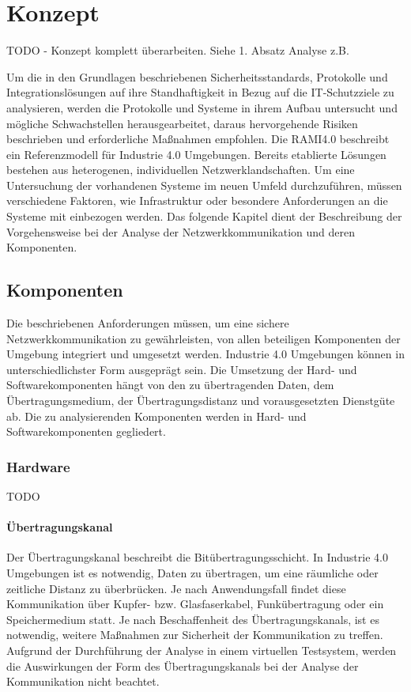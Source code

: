 \chapter{Konzept}
TODO - Konzept komplett überarbeiten. Siehe 1. Absatz Analyse z.B.

Um die in den Grundlagen beschriebenen Sicherheitsstandards, Protokolle und Integrationslösungen auf ihre Standhaftigkeit in Bezug auf die IT-Schutzziele zu analysieren, werden die Protokolle und Systeme in ihrem Aufbau untersucht und mögliche Schwachstellen herausgearbeitet, daraus hervorgehende Risiken beschrieben und erforderliche Maßnahmen empfohlen. Die \ac{RAMI4.0} beschreibt ein Referenzmodell für Industrie 4.0 Umgebungen. Bereits etablierte Lösungen bestehen aus heterogenen, individuellen Netzwerklandschaften. Um eine Untersuchung der vorhandenen Systeme im neuen Umfeld durchzuführen, müssen verschiedene Faktoren, wie Infrastruktur oder besondere Anforderungen an die Systeme mit einbezogen werden. Das folgende Kapitel dient der Beschreibung der Vorgehensweise bei der Analyse der Netzwerkkommunikation und deren Komponenten.

\section{Komponenten}
Die beschriebenen Anforderungen müssen, um eine sichere Netzwerkkommunikation zu gewährleisten, von allen beteiligen Komponenten der Umgebung integriert und umgesetzt werden. Industrie 4.0 Umgebungen können in unterschiedlichster Form ausgeprägt sein. Die Umsetzung der Hard- und Softwarekomponenten hängt von den zu übertragenden Daten, dem Übertragungsmedium, der Übertragungsdistanz und vorausgesetzten Dienstgüte ab. Die zu analysierenden Komponenten werden in Hard- und Softwarekomponenten gegliedert.

\subsection{Hardware}

TODO

\subsubsection{Übertragungskanal}
Der Übertragungskanal beschreibt die Bitübertragungsschicht. In Industrie 4.0 Umgebungen ist es notwendig, Daten zu übertragen, um eine räumliche oder zeitliche Distanz zu überbrücken. Je nach Anwendungsfall findet diese Kommunikation über Kupfer- bzw. Glasfaserkabel, Funkübertragung oder ein Speichermedium statt. Je nach Beschaffenheit des Übertragungskanals, ist es notwendig, weitere Maßnahmen zur Sicherheit der Kommunikation zu treffen. Aufgrund der Durchführung der Analyse in einem virtuellen Testsystem, werden die Auswirkungen der Form des Übertragungskanals bei der Analyse der Kommunikation nicht beachtet.

